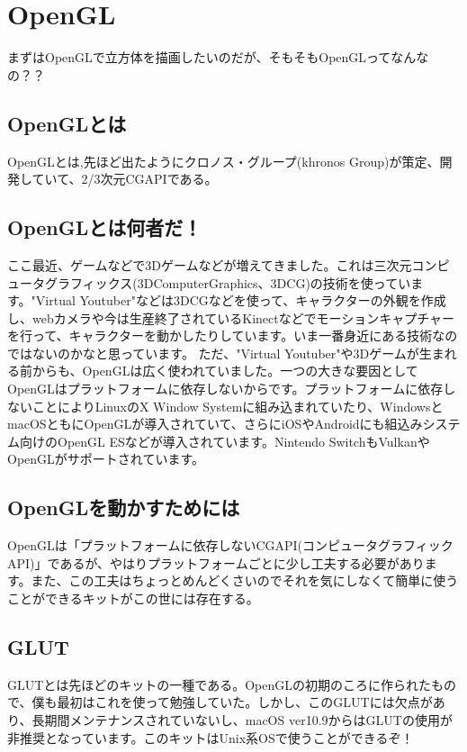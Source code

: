 \documentclass[a4paper,titlepage,dvipdfmx]{jsarticle}
\begin{document}
\newpage

\section{OpenGL}
まずはOpenGLで立方体を描画したいのだが、そもそもOpenGLってなんなの？？

\subsection{OpenGLとは}
OpenGLとは,先ほど出たようにクロノス・グループ(khronos Group)が策定、開発していて、2/3次元CGAPIである。

\subsection{OpenGLとは何者だ！}
ここ最近、ゲームなどで3Dゲームなどが増えてきました。これは三次元コンピュータグラフィックス(3DComputerGraphics、3DCG)の技術を使っています。"Virtual Youtuber"などは3DCGなどを使って、キャラクターの外観を作成し、webカメラや今は生産終了されているKinectなどでモーションキャプチャーを行って、キャラクターを動かしたりしています。いま一番身近にある技術なのではないのかなと思っています。
ただ、"Virtual Youtuber"や3Dゲームが生まれる前からも、OpenGLは広く使われていました。一つの大きな要因としてOpenGLはプラットフォームに依存しないからです。プラットフォームに依存しないことによりLinuxのX Window Systemに組み込まれていたり、WindowsとmacOSともにOpenGLが導入されていて、さらにiOSやAndroidにも組込みシステム向けのOpenGL ESなどが導入されています。Nintendo SwitchもVulkanやOpenGLがサポートされています。

\subsection{OpenGLを動かすためには}
OpenGLは「プラットフォームに依存しないCGAPI(コンピュータグラフィックAPI)」であるが、やはりプラットフォームごとに少し工夫する必要があります。また、この工夫はちょっとめんどくさいのでそれを気にしなくて簡単に使うことができるキットがこの世には存在する。

\subsection{GLUT}
GLUTとは先ほどのキットの一種である。OpenGLの初期のころに作られたもので、僕も最初はこれを使って勉強していた。しかし、このGLUTには欠点があり、長期間メンテナンスされていないし、macOS ver10.9からはGLUTの使用が非推奨となっています。このキットはUnix系OSで使うことができるぞ！
\end{document}
